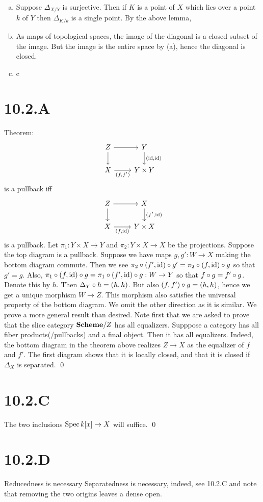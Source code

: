 \documentclass{article}
\begin{document}
\begin{enumerate}[a.]
    \item Suppose $\Delta_{X/Y}$ is surjective. Then if $K$ is a
          point of $X$ which lies over a point $k$ of
          $Y$ then $\Delta_{K/k}$ is a single point. By the
          above lemma,
    \item As maps of topological spaces, the image of the diagonal is a closed subset of
          the image. But the image is the entire space by (a), hence the diagonal is
          closed.
    \item c
\end{enumerate}

\section{10.2.A}
Theorem: \[\begin{tikzcd}
        Z & Y           \\
        X & {Y\times Y}
        \arrow["{(\operatorname{id}, \operatorname{id})}", from=1-2, to=2-2]
        \arrow[from=1-1, to=2-1]
        \arrow["{(f, f')}"', from=2-1, to=2-2]
        \arrow[from=1-1, to=1-2]
    \end{tikzcd}\] is a pullback iff  \[\begin{tikzcd}
        Z & X           \\
        X & {Y\times X}
        \arrow["{(f', \operatorname{id})}", from=1-2, to=2-2]
        \arrow[from=1-1, to=2-1]
        \arrow["{(f, \operatorname{id})}"', from=2-1, to=2-2]
        \arrow[from=1-1, to=1-2]
    \end{tikzcd}\] is a
pullback. Let $\pi_1: Y \times X \to Y$ and $\pi_2: Y \times X \to X$ be the
projections. Suppose the top diagram is a pullback. Suppose we have maps
$g, g': W \to X$ making the bottom diagram commute. Then we see
$\pi_2 \circ (f', \operatorname{id}) \circ g' = \pi_2 \circ (f, \operatorname{id}) \circ g$ so that $g'=g$. Also,
$\pi_1 \circ (f,\operatorname{id}) \circ g = \pi_1 \circ (f',\operatorname{id}) \circ g:
    W \to Y$ so that $f \circ g = f' \circ g$. Denote this by
$h$. Then $\Delta_Y \circ h=(h, h)$. But also
$(f, f') \circ g = (h, h)$, hence we get a unique morphism $W \to Z$.
This morphism also satisfies the universal property of the bottom diagram. We
omit the other direction as it is similar. We prove a more general result than
desired. Note first that we are asked to prove that the slice category
$\mathbf{Scheme}/Z$ has all equalizers. Supppose a category has all fiber
products(/pullbacks) and a final object. Then it has all equalizers. Indeed,
the bottom diagram in the theorem above realizes $Z \to X$ as the
equalizer of $f$ and $f'$. The first
diagram shows that it is locally closed, and that it is closed if
$\Delta_X$ is separated. \qed

\section{10.2.C}
The two inclusions $\operatorname{Spec} k[x] \to X$ will suffice. \qed

\section{10.2.D}
Reducedness is necessary Separatedness is necessary, indeed, see 10.2.C and
note that removing the two origins leaves a dense open.
\end{document}
